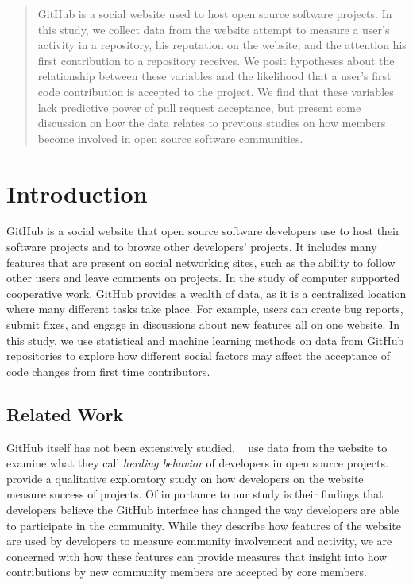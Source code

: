\documentclass[12pt]{article}
\begin{document}
\maketitle

\begin{abstract}
GitHub is a social website used to host open source software projects. In this
study, we collect data from the website attempt to measure a user's activity in
a repository, his reputation on the website, and the attention his first
contribution to a repository receives. We posit hypotheses about the
relationship between these variables and the likelihood that a user's first code
contribution is accepted to the project. We find that these variables lack
predictive power of pull request acceptance, but present some discussion on how
the data relates to previous studies on how members become involved in open
source software communities.
\end{abstract}

\section{Introduction}
GitHub is a social website that open source software developers use to host
their software projects and to browse other developers' projects. It includes
many features that are present on social networking sites, such as the ability
to follow other users and leave comments on projects. In the study of computer
supported cooperative work, GitHub provides a wealth of data, as it is a
centralized location where many different tasks take place. For example, users
can create bug reports, submit fixes, and engage in discussions about new
features all on one website.  In this study, we use statistical and machine
learning methods on data from GitHub repositories to explore how different
social factors may affect the acceptance of code changes from first time
contributors.

\subsection{Related Work}
GitHub itself has not been extensively studied. ~\cite{choi_herding_2013} use
data from the website to examine what they call \textit{herding behavior} of
developers in open source projects.  ~\cite{mcdonald_performance_2013} provide a
qualitative exploratory study on how developers on the website measure success
of projects. Of importance to our study is their findings that developers
believe the GitHub interface has changed the way developers are able to
participate in the community. While they describe how features of the website
are used by developers to measure community involvement and activity, we are
concerned with how these features can provide measures that insight into how
contributions by new community members are accepted by core members.
\end{document}
